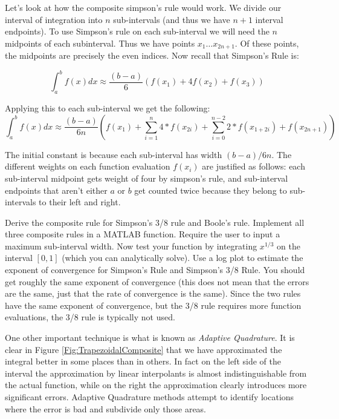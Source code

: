 Let's look at how the composite simpson's rule would work. We divide our interval of integration into $n$ sub-intervals (and thus we have $n+1$ interval endpoints). To use Simpson's rule on each sub-interval we will need the $n$ midpoints of each subinterval. Thus we have points $x_1 \ldots x_{2n+1}$. Of these points, the midpoints are precisely the even indices. Now recall that Simpson's Rule is:

\[
\int_a^b f(x) dx \approx \frac{(b-a)}{6}\left(f(x_1) + 4 f(x_2) + f(x_3)\right)
\]

Applying this to each sub-interval we get the following:
\[
\int_a^b f(x) dx \approx \frac{(b-a)}{6n}\left( f(x_1) + \sum_{i=1}^{n} 4*f(x_{2i}) + \sum_{i=0}^{n-2} 2*f(x_{1+2i}) + f(x_{2n+1})\right)
\]

The initial constant is because each sub-interval has width $(b-a)/6n$. The different weights on each function evaluation $f(x_i)$ are justified as follows: each sub-interval midpoint gets weight of four by simpson's rule, and sub-interval endpoints that aren't either $a$ or $b$ get counted twice because they belong to sub-intervals to their left and right.

\begin{problem}
Derive the composite rule for Simpson's 3/8 rule and Boole's rule. Implement all three composite rules in a MATLAB function. Require the user to input a maximum sub-interval width. Now test your function by integrating $x^{1/3}$ on the interval $[0,1]$ (which you can analytically solve). Use a log plot to estimate the exponent of convergence for Simpson's Rule and Simpson's 3/8 Rule. You should get roughly the same exponent of convergence (this does not mean that the errors are the same, just that the rate of convergence is the same). Since the two rules have the same exponent of convergence, but the 3/8 rule requires more function evaluations, the 3/8 rule is typically not used.
\end{problem}

One other important technique is what is known as \emph{Adaptive Quadrature}. It is clear in Figure \ref{Fig:TrapezoidalComposite} that we have approximated the integral better in some places than in others. In fact on the left side of the interval the approximation by linear interpolants is almost indistinguishable from the actual function, while on the right the approximation clearly introduces more significant errors. Adaptive Quadrature methods attempt to identify locations where the error is bad and subdivide only those areas.

